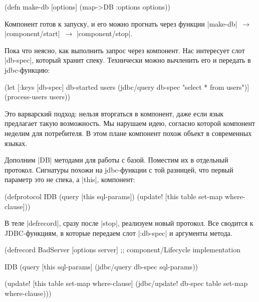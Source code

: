 \begin{english}
  \begin{clojure}
(defn make-db [options]
  (map->DB {:options options}))
  \end{clojure}
\end{english}

Компонент готов к запуску, и его можно прогнать через функции
\spverb|make-db|~$\to$ \spverb|component/start|~$\to$ \spverb|component/stop|.

Пока что неясно, как выполнить запрос через компонент. Нас интересует слот
\spverb|db-spec|, который хранит спеку. Технически можно вычленить его и
передать в jdbc-функцию:

\begin{english}
  \begin{clojure}
(let [{:keys [db-spec]} db-started
      users (jdbc/query db-spec "select * from users")]
  (process-users users))
  \end{clojure}
\end{english}

Это варварский подход: нельзя вторгаться в компонент, даже если язык предлагает
такую возможность. Мы нарушаем идею, согласно которой компонент неделим для
потребителя. В этом плане компонент похож объект в современных языках.

Дополним \spverb|DB| методами для работы с базой. Поместим их в отдельный
протокол. Сигнатуры похожи на jdbc-функции с той разницей, что первый параметр
это не спека, а \spverb|this|, компонент:

\begin{english}
  \begin{clojure}
(defprotocol IDB
  (query [this sql-params])
  (update! [this table set-map where-clause]))
  \end{clojure}
\end{english}

В теле \spverb|defrecord|, сразу после \spverb|stop|, реализуем новый
протокол. Все сводится к JDBC-функциям, в которые передаем слот
\spverb|:db-spec| и аргументы метода.

\begin{english}
  \begin{clojure}
(defrecord BadServer [options server]
  ;; component/Lifecycle implementation

  IDB
  (query [this sql-params]
    (jdbc/query db-spec sql-params))

  (update! [this table set-map where-clause]
    (jdbc/update! db-spec table set-map where-clause)))
  \end{clojure}
\end{english}

